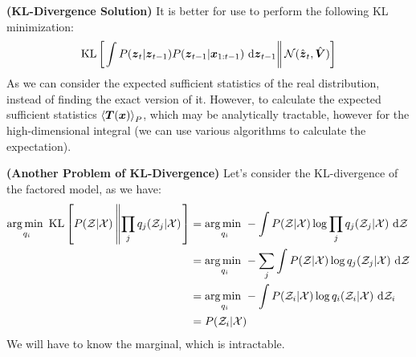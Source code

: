 \begin{remark}{\textbf{(KL-Divergence Solution)}}
    It is better for use to perform the following KL minimization:
    \begin{equation*}
        \operatorname{KL}\left[ \left. \int P(\boldsymbol z_t|\boldsymbol z_{t-1})P(\boldsymbol z_{t-1}|\boldsymbol x_{1:t-1})\ \mathrm{d} \boldsymbol z_{t-1} \right\|  \mathcal{N}(\hat{\boldsymbol z}_t, \hat{\boldsymbol V})  \right]
    \end{equation*}
    As we can consider the expected sufficient statistics of the real distribution, instead of finding the exact version of it. However, to calculate the expected sufficient statistics $\left\langle \boldsymbol T(\boldsymbol x) \right\rangle_P$, which may be analytically tractable, however for the high-dimensional integral (we can use various algorithms to calculate the expectation).
\end{remark}

\begin{remark}{\textbf{(Another Problem of KL-Divergence)}}
    Let's consider the KL-divergence of the factored model, as we have:
    \begin{equation*}
    \begin{aligned}
        \underset{q_i}{\arg\min \ } \operatorname{KL}\left[ P(\mathcal{Z} | \mathcal{X}) \left\| \prod_j q_j(\mathcal{Z}_j | \mathcal{X}) \right. \right] &= \underset{q_i}{\arg\min \ } -\int P(\mathcal{Z} | \mathcal{X})\log \prod_j q_j(\mathcal{Z}_j | \mathcal{X})\ \mathrm{d}\mathcal{Z} \\
        &= \underset{q_i}{\arg\min \ } - \sum_j \int P(\mathcal{Z}|\mathcal{X})\log q_j(\mathcal{Z}_j|\mathcal{X})\ \mathrm{d}\mathcal{Z} \\
        &=  \underset{q_i}{\arg\min \ } - \int P(\mathcal{Z}_i|\mathcal{X})\log q_i(\mathcal{Z}_i|\mathcal{X})\ \mathrm{d}\mathcal{Z}_i \\
        &= P(\mathcal{Z}_i | \mathcal{X})
    \end{aligned}
    \end{equation*}
    We will have to know the marginal, which is intractable. 
\end{remark}

